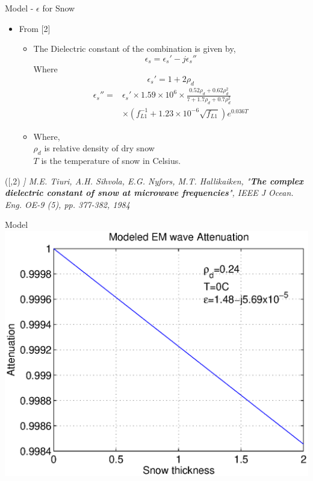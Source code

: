 \documentclass{beamer}
\newenvironment{reference}[2]{%
  \begin{textblock*}{\textwidth}(#1,#2) 
      \footnotesize\it\bgroup\color{red!50!black}}{\egroup\end{textblock*}}
\begin{document}
\begin{frame}{Model - $\epsilon$ for Snow}
\begin{itemize}
  \item From [2] 
    \begin{itemize}
      \item The Dielectric constant of the combination is given by,
        \begin{equation*}
          \epsilon_s = \epsilon_s'  - j\epsilon_s''
        \end{equation*}
        Where
        \begin{equation*}
            \epsilon_s' = 1 + 2 \rho_d
        \end{equation*}
        \begin{align*}
          \epsilon_s'' = &\epsilon_s' \times 1.59 \times 10^6 \times \frac{0.52\rho_d + 0.62\rho_d^2}{7 + 1.7\rho_d + 0.7\rho_d^2}\\
          & \times (f_{L1}^{-1} + 1.23 \times 10^{-6}\sqrt{f_{L1}})e^{0.036 T}
        \end{align*}
      \item Where, \\$\rho_d$ is relative density of dry snow \\$T$ is the temperature of snow in Celsius.
    \end{itemize}
\end{itemize}

\begin{reference}{4mm}{85mm}
 [2] M.E. Tiuri, A.H. Sihvola, E.G. Nyfors, M.T. Hallikaiken, "\emph{\bf The complex dielectric constant of snow at microwave frequencies}", IEEE J Ocean. Eng. OE-9 (5), pp. 377-382, 1984
\end{reference}

\end{frame}

\begin{frame}{Model}
  \includegraphics[width=1\linewidth]{model_1.eps}
\end{frame}
\end{document}
